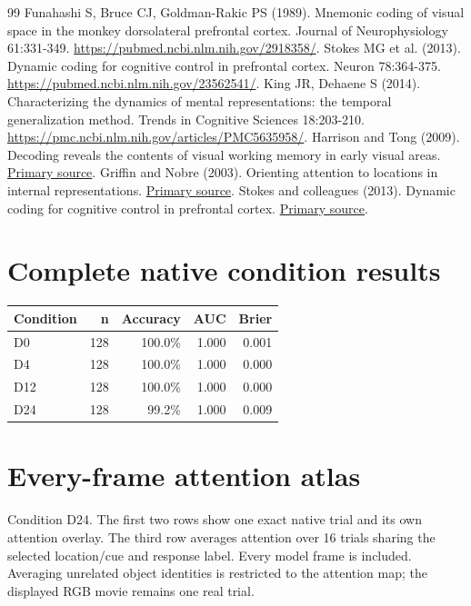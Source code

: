 \documentclass[11pt]{article}
\begin{document}
\begin{thebibliography}{99}
 Funahashi S, Bruce CJ, Goldman-Rakic PS (1989). Mnemonic coding of visual space in the monkey dorsolateral prefrontal cortex. Journal of Neurophysiology 61:331-349. \url{https://pubmed.ncbi.nlm.nih.gov/2918358/}.
 Stokes MG et al. (2013). Dynamic coding for cognitive control in prefrontal cortex. Neuron 78:364-375. \url{https://pubmed.ncbi.nlm.nih.gov/23562541/}.
 King JR, Dehaene S (2014). Characterizing the dynamics of mental representations: the temporal generalization method. Trends in Cognitive Sciences 18:203-210. \url{https://pmc.ncbi.nlm.nih.gov/articles/PMC5635958/}.
 Harrison and Tong (2009). Decoding reveals the contents of visual working memory in early visual areas. \href{https://pubmed.ncbi.nlm.nih.gov/19225460/}{Primary source}.
 Griffin and Nobre (2003). Orienting attention to locations in internal representations. \href{https://pubmed.ncbi.nlm.nih.gov/14709235/}{Primary source}.
 Stokes and colleagues (2013). Dynamic coding for cognitive control in prefrontal cortex. \href{https://pmc.ncbi.nlm.nih.gov/articles/PMC3898895/}{Primary source}.
\end{thebibliography}\clearpage\appendix\section{Complete native condition results}
\small\begin{longtable}{p{}rrrr}\toprule Condition & n & Accuracy & AUC & Brier\\\midrule\endhead
D0 & 128 & 100.0\% & 1.000 & 0.001\\
D4 & 128 & 100.0\% & 1.000 & 0.000\\
D12 & 128 & 100.0\% & 1.000 & 0.000\\
D24 & 128 & 99.2\% & 1.000 & 0.009\\
\bottomrule\end{longtable}\normalsize\section{Every-frame attention atlas}
Condition D24. The first two rows show one exact native trial and its own attention overlay. The third row averages attention over 16 trials sharing the selected location/cue and response label. Every model frame is included. Averaging unrelated object identities is restricted to the attention map; the displayed RGB movie remains one real trial.
\end{document}
